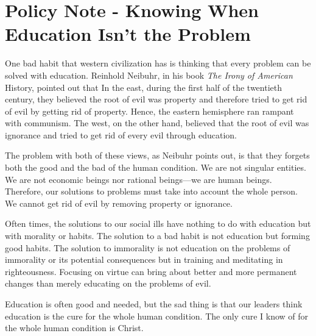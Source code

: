 \documentclass[letterpaper]{article}
\begin{document}
\section{Policy Note - Knowing When Education Isn’t the Problem}
{\color{black}
One bad habit that western civilization has is thinking that every
problem can be solved with education. Reinhold Neibuhr, in his book
\textit{The Irony of American }History, pointed out that In the east,
during the first half of the twentieth century, they believed the root
of evil was property and therefore tried to get rid of evil by getting
rid of property. Hence, the eastern hemisphere ran rampant with
communism. The west, on the other hand, believed that the root of evil
was ignorance and tried to get rid of every evil through education.}

{\color{black}
The problem with both of these views, as Neibuhr points out, is that
they forgets both the good and the bad of the human condition. We are
not singular entities. We are not economic beings nor rational
beings—we are human beings. Therefore, our solutions to problems must
take into account the whole person.  We cannot get rid of evil by
removing property or ignorance.}

{\color{black}
Often times, the solutions to our social ills have nothing to do with
education but with morality or habits. The solution to a bad habit is
not education but forming good habits. The solution to immorality is
not education on the problems
\textcolor[rgb]{0.32941177,0.5529412,0.83137256}{of} immorality or its
potential consequences but in training and meditating in righteousness.
 Focusing on virtue can bring about better and more permanent changes
than merely educating on the problems of evil.}

{\color{black}
Education is often good and needed, but the sad thing is that our
leaders think education is the cure for the whole human condition. The
only cure I know of for the whole human condition is Christ.}
\end{document}
